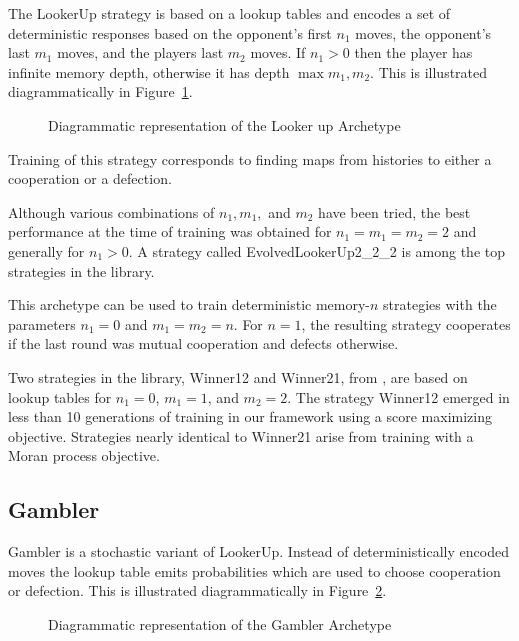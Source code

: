 \documentclass{article}
\begin{document}
The LookerUp strategy is based on a lookup tables and  encodes a set of
deterministic responses based on the opponent's first $n_1$ moves, the
opponent's last $m_1$ moves, and the players last $m_2$ moves. If $n_1 > 0$ then
the player has infinite memory depth, otherwise it has depth $\max{m_1, m_2}$.
This is illustrated diagrammatically in Figure~\ref{fig:lookerup}.

\begin{figure}[!hbtp]
    \centering
    
    \caption{Diagrammatic representation of the Looker up Archetype}
    \label{fig:lookerup}
\end{figure}

Training of this strategy corresponds to finding maps from histories to either a
cooperation or a defection.

Although various
combinations of $n_1, m_1,$ and $m_2$ have been tried, the best performance at
the time of
training was obtained for $n_1 = m_1 = m_2 = 2$ and generally for $n_1 > 0$.
A strategy
called EvolvedLookerUp2\_2\_2 is among the top strategies in the library.

This archetype can be used to train deterministic memory-$n$ strategies with the
parameters $n_1=0$ and $m_1=m_2=n$. For $n=1$, the resulting strategy cooperates
if the last round was mutual cooperation and defects otherwise.

Two strategies in the library, Winner12 and Winner21, from \cite{Mathieu2015},
are based on lookup tables for $n_1 = 0$, $m_1 = 1$, and $m_2=2$. The strategy
Winner12 emerged in less than 10 generations of training in our framework using
a score maximizing objective. Strategies nearly identical to Winner21 arise
from training with a Moran process objective.

\subsection{Gambler}

Gambler is a stochastic variant of LookerUp. Instead of deterministically
encoded moves the lookup table emits probabilities which are
used to choose cooperation or defection.
This is illustrated diagrammatically in Figure~\ref{fig:gambler}.

\begin{figure}[!hbtp]
    \centering
    
    \caption{Diagrammatic representation of the Gambler Archetype}
    \label{fig:gambler}
\end{figure}
\end{document}
